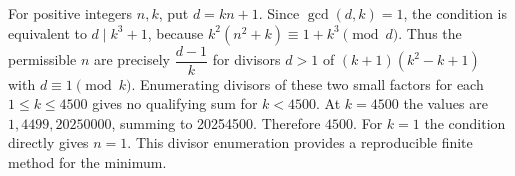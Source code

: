 For positive integers $n,k$, put $d=kn+1$. Since $\gcd(d,k)=1$, the condition is equivalent to $d\mid k^3+1$, because $k^2(n^2+k)\equiv1+k^3\pmod d$. Thus the permissible $n$ are precisely $\dfrac{d-1}{k}$ for divisors $d>1$ of $(k+1)(k^2-k+1)$ with $d\equiv1\pmod k$. Enumerating divisors of these two small factors for each $1\le k\le4500$ gives no qualifying sum for $k<4500$. At $k=4500$ the values are $1,4499,20250000$, summing to 20254500. Therefore $\boxed{4500}$. For $k=1$ the condition directly gives $n=1$. This divisor enumeration provides a reproducible finite method for the minimum.
